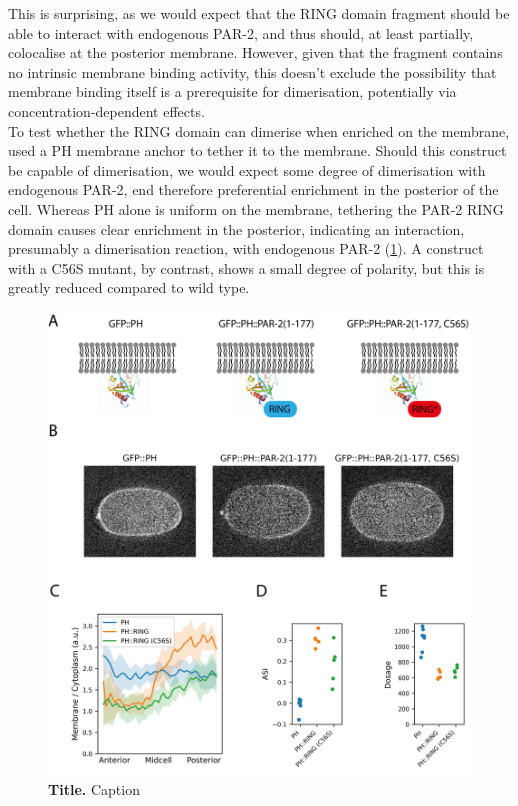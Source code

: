 \documentclass[12pt]{"article"}
\newcommand{\mycaption}[2]{\caption[#1]{\textbf{#1.} #2}}
\begin{document}
This is surprising, as we would expect that the RING domain fragment should be able to interact with endogenous PAR-2, and thus should, at least partially, colocalise at the posterior membrane. However, given that the fragment contains no intrinsic membrane binding activity, this doesn't exclude the possibility that membrane binding itself is a prerequisite for dimerisation, potentially via concentration-dependent effects.\\

To test whether the RING domain can dimerise when enriched on the membrane, used a PH membrane anchor to tether it to the membrane. Should this construct be capable of dimerisation, we would expect some degree of dimerisation with endogenous PAR-2, end therefore preferential enrichment in the posterior of the cell. Whereas PH alone is uniform on the membrane, tethering the PAR-2 RING domain causes clear enrichment in the posterior, indicating an interaction, presumably a dimerisation reaction, with endogenous PAR-2 (\cref{fig:ph_ring}). A construct with a C56S mutant, by contrast, shows a small degree of polarity, but this is greatly reduced compared to wild type.\\

\begin{figure}[!h]
\includegraphics[scale=1]{ph_ring}
\setlength{\abovecaptionskip}{20pt}
\centering
\mycaption{Title}{Caption}
\label{fig:ph_ring}
\end{figure}
\end{document}
